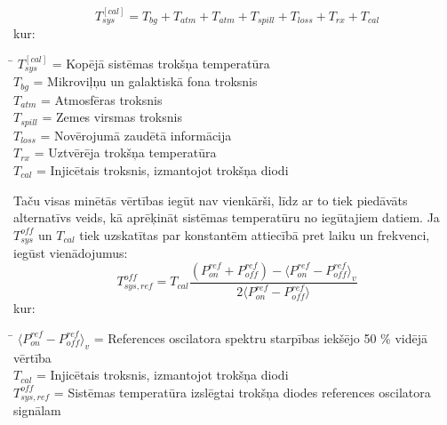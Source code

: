 \begin{equation}
T_{sys}^{[cal]} = T_{bg} + T_{atm} + T_{atm} + T_{spill} + T_{loss} + T_{rx} + T_{cal} \tag{1.2.1}\label{eq:1.2.1} 
\end{equation}
kur: 
\begin{tabbing}
\phantom{\hspace{10mm}}\= \kill
$T_{sys}^{[cal]}$\> = Kopējā sistēmas trokšņa temperatūra \\
$T_{bg}$\> = Mikroviļņu un galaktiskā fona troksnis \\
$T_{atm}$\> = Atmosfēras troksnis \\
$T_{spill}$\> = Zemes virsmas troksnis \\
$T_{loss}$\> = Novērojumā zaudētā informācija \\
$T_{rx}$\> = Uztvērēja trokšņa temperatūra \\
$T_{cal}$\>   =  Injicētais troksnis, izmantojot trokšņa diodi\\
\end{tabbing}



Taču visas minētās vērtības iegūt nav vienkārši, līdz ar to tiek piedāvāts alternatīvs veids, kā aprēķināt sistēmas temperatūru no iegūtajiem datiem. Ja $T_{sys}^{off}$ un $T_{cal}$ tiek uzskatītas par konstantēm attiecībā pret laiku un frekvenci, iegūst vienādojumus:
\begin{equation}
T_{sys,ref}^{off} = T_{cal} \frac{ \left( P_{on}^{ref} + P_{off}^{ref} \right)  -  \langle P_{on}^{ref} - P_{off}^{ref} \rangle_v }{2 \langle  P_{on}^{ref} - P_{off}^{ref} \rangle} \tag{1.2.2}\label{eq:1.2.2} 
\end{equation}
kur: 
\begin{tabbing}
\phantom{\hspace{30mm}}\= \kill
$\langle P_{on}^{ref} - P_{off}^{ref} \rangle_v$\> = References oscilatora spektru starpības iekšējo 50 \% vidējā vērtība\\
$T_{cal}$\>   =  Injicētais troksnis, izmantojot trokšņa diodi\\
$T_{sys,ref}^{off}$\> = Sistēmas temperatūra izslēgtai trokšņa diodes references oscilatora signālam\\
\end{tabbing}

